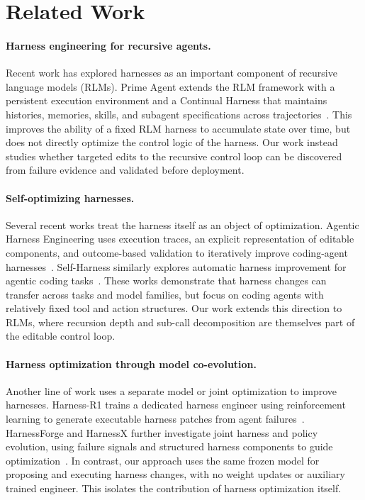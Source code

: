 \documentclass[letterpaper]{article} %
\begin{document}

\section{Related Work}

\paragraph{Harness engineering for recursive agents.}
Recent work has explored harnesses as an important component of recursive language models (RLMs). Prime Agent extends the RLM framework with a persistent execution environment and a Continual Harness that maintains histories, memories, skills, and subagent specifications across trajectories~\citep{karten2026primeagent}. This improves the ability of a fixed RLM harness to accumulate state over time, but does not directly optimize the control logic of the harness. Our work instead studies whether targeted edits to the recursive control loop can be discovered from failure evidence and validated before deployment.

\paragraph{Self-optimizing harnesses.}
Several recent works treat the harness itself as an object of optimization. Agentic Harness Engineering uses execution traces, an explicit representation of editable components, and outcome-based validation to iteratively improve coding-agent harnesses~\citep{lin2026agenticharness}. Self-Harness similarly explores automatic harness improvement for agentic coding tasks~\citep{zhang2026selfharness}. These works demonstrate that harness changes can transfer across tasks and model families, but focus on coding agents with relatively fixed tool and action structures. Our work extends this direction to RLMs, where recursion depth and sub-call decomposition are themselves part of the editable control loop.

\paragraph{Harness optimization through model co-evolution.}
Another line of work uses a separate model or joint optimization to improve harnesses. Harness-R1 trains a dedicated harness engineer using reinforcement learning to generate executable harness patches from agent failures~\citep{shao2026harnessr1}. HarnessForge and HarnessX further investigate joint harness and policy evolution, using failure signals and structured harness components to guide optimization~\citep{chen2026harnessforge,chen2026harnessx}. In contrast, our approach uses the same frozen model for proposing and executing harness changes, with no weight updates or auxiliary trained engineer. This isolates the contribution of harness optimization itself.
\end{document}

